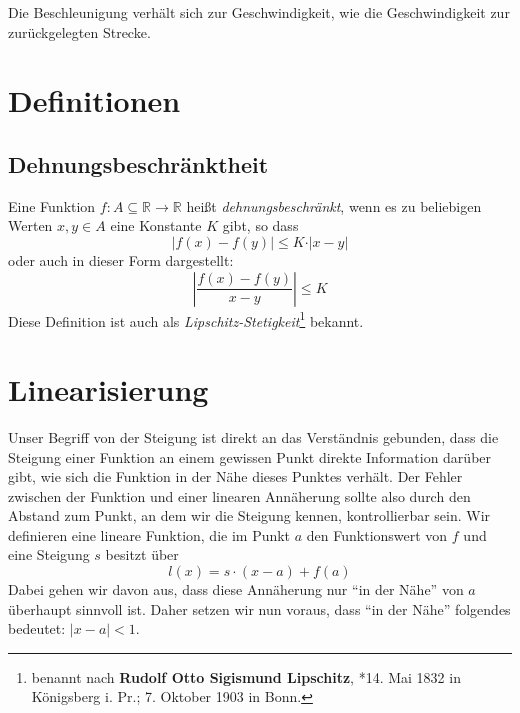 \begin{fancyquotes}
Die Beschleunigung verhält sich zur Geschwindigkeit, wie die Geschwindigkeit zur zurückgelegten Strecke. 
\end{fancyquotes}

\section{Definitionen}

\subsection{Dehnungsbeschränktheit}

\begin{definition}\label{def:lipschitz}
Eine Funktion $f : A \subseteq \mathbb{R} \longrightarrow \mathbb{R}$ heißt \emph{dehnungsbeschränkt}, wenn es zu beliebigen Werten $x,y\in A$ eine Konstante $K$ gibt, so dass
\[
\left\vert f(x)-f(y)  \right\vert \le K\cdot \vert x-y \vert
\]
oder auch in dieser Form dargestellt:
\[
\left\vert \frac{f(x)-f(y)}{x-y}  \right\vert \le K
\]
Diese Definition ist auch als \emph{Lipschitz-Stetigkeit}\footnote{benannt nach \textbf{Rudolf Otto Sigismund Lipschitz}, *14. Mai 1832 in Königsberg i. Pr.; 7. Oktober 1903 in Bonn.} bekannt.
\end{definition}


\section{Linearisierung}

Unser Begriff von der Steigung ist direkt an das Verständnis gebunden, dass die Steigung einer Funktion an einem gewissen Punkt direkte Information darüber gibt, wie sich die Funktion in der Nähe dieses Punktes verhält. Der Fehler zwischen der Funktion und einer linearen Annäherung sollte also durch den Abstand zum Punkt, an dem wir die Steigung kennen, kontrollierbar sein. Wir definieren eine lineare Funktion, die im Punkt $a$ den Funktionswert von $f$  und eine Steigung $s$ besitzt über
\[
l(x) = s\cdot (x-a)+f(a)
\]
Dabei gehen wir davon aus, dass diese Annäherung nur "`in der Nähe"' von $a$ überhaupt sinnvoll ist. Daher setzen wir nun voraus, dass "`in der Nähe"' folgendes bedeutet: $|x-a|<1$.

